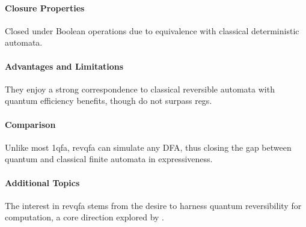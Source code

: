 \paragraph{Closure Properties}
Closed under Boolean operations due to equivalence with classical deterministic automata.

\paragraph{Advantages and Limitations}
They enjoy a strong correspondence to classical reversible automata with quantum efficiency benefits, though do not surpass \glspl{reg}.

\paragraph{Comparison}
Unlike most \gls{1qfa}, \gls{revqfa} can simulate any DFA, thus closing the gap between quantum and classical finite automata in expressiveness.

\paragraph{Additional Topics}
The interest in \gls{revqfa} stems from the desire to harness quantum reversibility for computation, a core direction explored by \cite{ciamarra2001quantum}.
